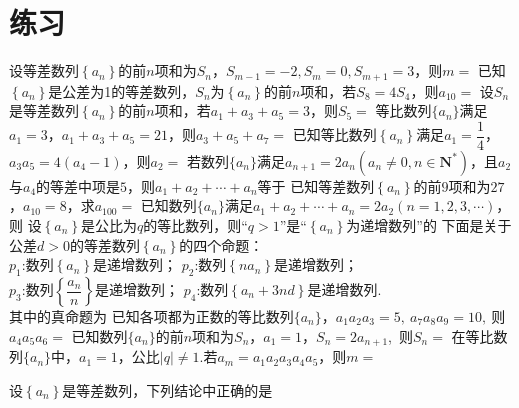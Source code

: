 \documentclass{BHCexam}
\begin{document}
\section{练习}
\begin{questions}
 
\question
设等差数列$\left\{a_n\right\}$的前$n$项和为$S_n$，$S_{m-1}=-2,S_m=0,S_{m+1}=3$，则$m=$\xx
{}
\qs
已知$\left\{a_n\right\}$是公差为1的等差数列，$S_n$为$\left\{a_n\right\}$的前$n$项和，若$S_8=4S_4$，则$a_{10}=$\xx
{}
\qs 设$S_n$是等差数列$\left\{a_n\right\}$的前$n$项和，若$a_1+a_3+a_5=3$，则$S_5=$\xx
{}
\qs 等比数列$\{a_n\}$满足$a_1=3$，$a_1+a_3+a_5=21$，则$ a_3+a_5+a_7= $\xx
{}
\qs 已知等比数列$\left\{a_n\right\}$满足$a_1=\dfrac{1}{4}$，$a_3a_5=4(a_4-1)$，则$a_2=$\xx
{}
\qs 若数列$\{a_n\}$满足$a_{n+1}=2a_n\left(a_n\ne 0, n\in\mathbf{N^*}\right)$，且$a_2$与$a_4$的等差中项是$ 5 $，则$ a_1+a_2+\cdots +a_n$等于\xx
{}
\qs
已知等差数列$ \left\{a_n\right\} $的前$ 9 $项和为$27$，$a_{10}=8$，求$a_{100}=$\xx
{}
\qs 已知数列$\{a_n\}$满足$ a_1+a_2+\cdots+a_n=2a_2 \left(n=1,2,3,\cdots\right)$，则\xx
{}
\qs
设$ \left\{a_n\right\} $是公比为$q$的等比数列，则“$ q>1$”是“$ \left\{a_n\right\} $为递增数列”的\xx
{}
\qs
下面是关于公差$d>0$的等差数列$ \left\{a_n\right\} $的四个命题：\\
$p_1$:数列$ \left\{a_n\right\} $是递增数列；\qquad
\phantom{p}$p_2$:数列$ \left\{na_n\right\} $是递增数列；\\
$p_3$:数列$ \left\{\dfrac{a_n}{n}\right\} $是递增数列；\qquad
$p_4$:数列$\left\{a_n+3nd\right\}$是递增数列.\\
其中的真命题为\xx
{}
\qs 已知各项都为正数的等比数列$\{a_n\}$，$a_1a_2a_3=5,~a_7a_8a_9=10,~  $则$ a_4a_5a_6= $\xx
{}
\qs 已知数列$\{a_n\}$的前$n$项和为$S_n$，$a_1=1$，$S_n=2a_{n+1}$,~则$S_n=$\xx
{}
\qs
在等比数列$\{a_n\}$中，$a_1=1$，公比$ |q|\ne 1 $.若$ a_m=a_1a_2a_3a_4a_5 $，则$ m= $\xx
{}

\qs 
设$ \left\{a_n\right\} $是等差数列，下列结论中正确的是\xx
{}


\end{questions}
\end{document}
